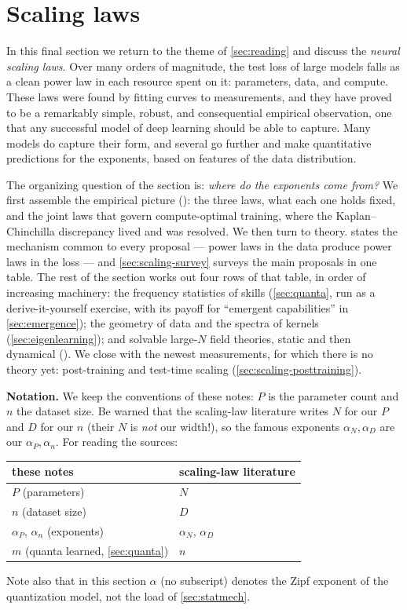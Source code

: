 \documentclass[11pt]{article}
\begin{document}
\section{Scaling laws}
\label{sec:scaling}

In this final section we return to the theme of \cref{sec:reading} and discuss the \emph{neural scaling laws}. Over many orders of magnitude, the test loss of large models falls as a clean power law in each resource spent on it: parameters, data, and compute. These laws were found by fitting curves to measurements, and they have proved to be a remarkably simple, robust, and consequential empirical observation, one that any successful model of deep learning should be able to capture. Many models do capture their form, and several go further and make quantitative predictions for the exponents, based on features of the data distribution.

The organizing question of the section is: \emph{where do the exponents come from?} We first assemble the empirical picture (): the three laws, what each one holds fixed, and the joint laws that govern compute-optimal training, where the Kaplan--Chinchilla discrepancy lived and was resolved. We then turn to theory.  states the mechanism common to every proposal --- power laws in the data produce power laws in the loss --- and \cref{sec:scaling-survey} surveys the main proposals in one table. The rest of the section works out four rows of that table, in order of increasing machinery: the frequency statistics of skills (\cref{sec:quanta}, run as a derive-it-yourself exercise, with its payoff for ``emergent capabilities'' in \cref{sec:emergence}); the geometry of data and the spectra of kernels (\cref{sec:eigenlearning}); and solvable large-$N$ field theories, static and then dynamical (). We close with the newest measurements, for which there is no theory yet: post-training and test-time scaling (\cref{sec:scaling-posttraining}).

\textbf{Notation.} We keep the conventions of these notes: $P$ is the parameter count and $n$ the dataset size. Be warned that the scaling-law literature writes $N$ for our $P$ and $D$ for our $n$ (their $N$ is \emph{not} our width!), so the famous exponents $\alpha_N,\alpha_D$ are our $\alpha_P,\alpha_n$. For reading the sources:
%
\begin{center}
\begin{tabular}{l|l}
these notes & scaling-law literature \cite{kaplan2020scaling,hoffmann2022training,michaud2023quantization,maloney2022solvable} \\\hline
$P$ (parameters) & $N$ \\
$n$ (dataset size) & $D$ \\
$\alpha_P$, $\alpha_n$ (exponents) & $\alpha_N$, $\alpha_D$ \\
$m$ (quanta learned, \cref{sec:quanta}) & $n$
\end{tabular}
\end{center}
%
Note also that in this section $\alpha$ (no subscript) denotes the Zipf exponent of the quantization model, not the load of \cref{sec:statmech}.
\end{document}

